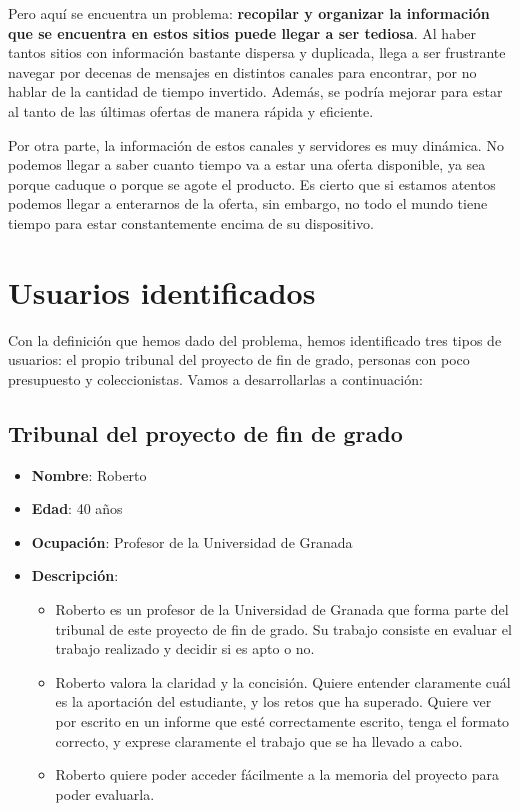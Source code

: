 Pero aquí se encuentra un problema: \textbf{recopilar y organizar la información 
que se encuentra en estos sitios puede llegar a ser tediosa}. Al haber tantos 
sitios con información bastante dispersa y duplicada, llega a ser frustrante 
navegar por decenas de mensajes en distintos canales para encontrar, por no hablar 
de la cantidad de tiempo invertido. Además, se podría mejorar para estar al tanto 
de las últimas ofertas de manera rápida y eficiente.

Por otra parte, la información de estos canales y servidores es muy dinámica. No 
podemos llegar a saber cuanto tiempo va a estar una oferta disponible, ya sea 
porque caduque o porque se agote el producto. Es cierto que si estamos atentos 
podemos llegar a enterarnos de la oferta, sin embargo, no todo el mundo tiene tiempo 
para estar constantemente encima de su dispositivo.

\section{Usuarios identificados}

Con la definición que hemos dado del problema, hemos identificado tres tipos de 
usuarios: el propio tribunal del proyecto de fin de grado, personas con poco 
presupuesto y coleccionistas. Vamos a desarrollarlas a continuación:

\subsection{Tribunal del proyecto de fin de grado}

\begin{itemize}
    \item \textbf{Nombre}: Roberto
    \item \textbf{Edad}: 40 años
    \item \textbf{Ocupación}: Profesor de la Universidad de Granada
    \item \textbf{Descripción}:
    \begin{itemize}
        \item Roberto es un profesor de la Universidad de Granada que forma parte 
        del tribunal de este proyecto de fin de grado. Su trabajo consiste en 
        evaluar el trabajo realizado  y decidir si es apto o no.
        \item Roberto valora la claridad y la concisión. Quiere entender claramente 
        cuál es la aportación del estudiante, y los retos que ha superado. Quiere 
        ver por escrito en un informe que esté correctamente escrito, tenga el 
        formato correcto, y exprese claramente el trabajo que se ha llevado a cabo.
        \item Roberto quiere poder acceder fácilmente a la memoria del proyecto para 
        poder evaluarla.
    \end{itemize}
\end{itemize}

